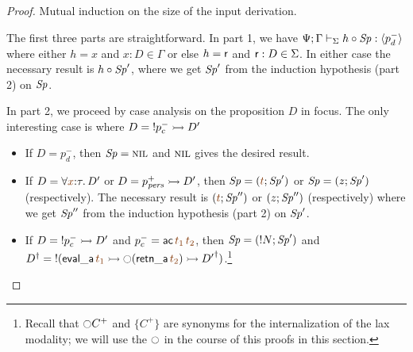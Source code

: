 \begin{proof}
Mutual induction on the size 
of the input derivation.

The first three parts are straightforward. In part 1, we have
${\Psi}; {\Gamma} \vdash_{\Sigma} {{h} \circ {{\it Sp}}} : {\langle {p^-_d} \rangle}$ where
either $h = x$ and $x{:}D \in \Gamma$ or else $h = {\sf r}$ and ${\sf
  r} : D \in \Sigma$. In either case the necessary result is
${h} \circ {{\it Sp}'}$, where we get ${\it Sp}'$ from the induction hypothesis
(part 2) on ${\it Sp}$.

In part 2, we proceed by case analysis on the proposition $D$ in focus. 
The only interesting case is where $D = {!}p^-_c \rightarrowtail D'$
\begin{itemize}
\item If $D = p_d^-$, then ${\it Sp} = \textsc{nil}$ and $\textsc{nil}$ gives the desired result.

\item If $D = \forall \lf{x}{:}\tau.\,D'$ or $D = p^+_{\it pers} \rightarrowtail D'$, then $\Sp = (\lf{t}; \Sp')$ 
  or ${\it Sp} = (z; {\it Sp}')$ (respectively). The necessary result is
  $(\lf{t}; {\Sp''})$ 
  or $({z}; {{\it Sp}''})$ (respectively) where we get ${\it Sp}''$ from the
  induction hypothesis (part 2) on ${\it Sp}'$. 

\item If $D = {!}p^-_c \rightarrowtail D'$ and $p^-_c = {\sf ac}\,\lf{t_1}\,\lf{t_2}$, 
  then 
  ${\it Sp} = ({!}{N};{{\it Sp}'})$
  and $\opsubst{D} = {!}({\sf eval\_a}\,\lf{t_1} \lefti {\ocircle}({\sf retn\_a}\,\lf{t_2}) \lefti \opsubst{D'})$.\footnote{Recall that ${\ocircle}C^+$ and $\{ C^+ \}$ are synonyms for the internalization of the lax modality; we will use the ${\ocircle}$ in the course of this proofs in this section.}


\end{itemize}
\end{proof}
